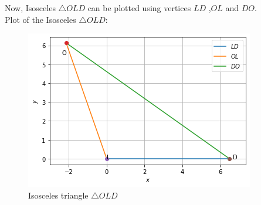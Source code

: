\documentclass[journal,12pt,twocolumn]{IEEEtran}
\begin{document}
Now, Isosceles $\triangle OLD$ can be plotted using vertices $LD$ ,$OL$ and $DO$.
\\
Plot of the Isosceles $\triangle OLD$:
\begin{figure}[H]
\centering
\includegraphics[width=\columnwidth]{diagram-1.png}
\caption{Isosceles  triangle $\triangle OLD$}
\label{fig:isosceles_triangle}	
\end{figure}
\end{document}
